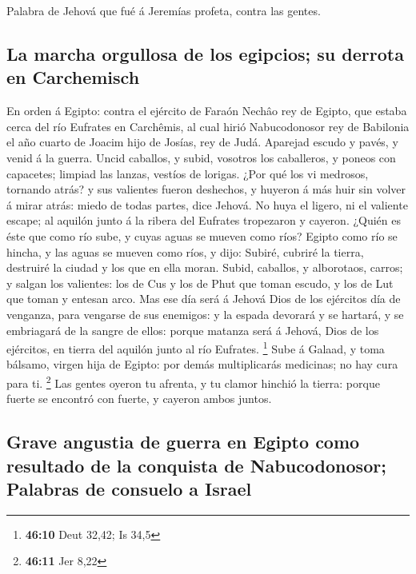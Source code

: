  Palabra de Jehová que fué á Jeremías profeta, contra las
gentes.

\hypertarget{la-marcha-orgullosa-de-los-egipcios-su-derrota-en-carchemisch}{%
\subsection{La marcha orgullosa de los egipcios; su derrota en
Carchemisch}\label{la-marcha-orgullosa-de-los-egipcios-su-derrota-en-carchemisch}}

 En orden á Egipto: contra el ejército de Faraón Nechâo
rey de Egipto, que estaba cerca del río Eufrates en Carchêmis, al cual
hirió Nabucodonosor rey de Babilonia el año cuarto de Joacim hijo de
Josías, rey de Judá.  Aparejad escudo y pavés, y venid á
la guerra.  Uncid caballos, y subid, vosotros los
caballeros, y poneos con capacetes; limpiad las lanzas, vestíos de
lorigas.  ¿Por qué los vi medrosos, tornando atrás? y sus
valientes fueron deshechos, y huyeron á más huir sin volver á mirar
atrás: miedo de todas partes, dice Jehová.  No huya el
ligero, ni el valiente escape; al aquilón junto á la ribera del Eufrates
tropezaron y cayeron.  ¿Quién es éste que como río sube, y
cuyas aguas se mueven como ríos?  Egipto como río se
hincha, y las aguas se mueven como ríos, y dijo: Subiré, cubriré la
tierra, destruiré la ciudad y los que en ella moran. 
Subid, caballos, y alborotaos, carros; y salgan los valientes: los de
Cus y los de Phut que toman escudo, y los de Lut que toman y entesan
arco.  Mas ese día será á Jehová Dios de los ejércitos
día de venganza, para vengarse de sus enemigos: y la espada devorará y
se hartará, y se embriagará de la sangre de ellos: porque matanza será á
Jehová, Dios de los ejércitos, en tierra del aquilón junto al río
Eufrates. \footnote{\textbf{46:10} Deut 32,42; Is 34,5} 
Sube á Galaad, y toma bálsamo, virgen hija de Egipto: por demás
multiplicarás medicinas; no hay cura para ti. \footnote{\textbf{46:11}
  Jer 8,22}  Las gentes oyeron tu afrenta, y tu clamor
hinchió la tierra: porque fuerte se encontró con fuerte, y cayeron ambos
juntos.

\hypertarget{grave-angustia-de-guerra-en-egipto-como-resultado-de-la-conquista-de-nabucodonosor-palabras-de-consuelo-a-israel}{%
\subsection{Grave angustia de guerra en Egipto como resultado de la
conquista de Nabucodonosor; Palabras de consuelo a
Israel}\label{grave-angustia-de-guerra-en-egipto-como-resultado-de-la-conquista-de-nabucodonosor-palabras-de-consuelo-a-israel}}

